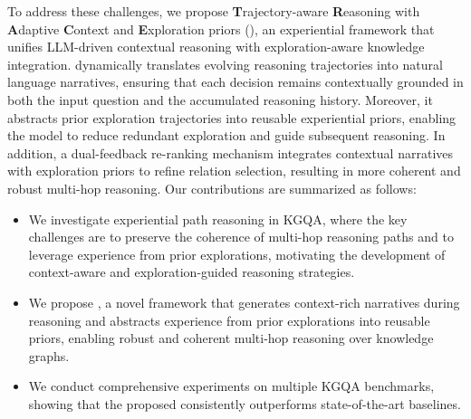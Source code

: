 To address these challenges, we propose \textbf{T}rajectory-aware \textbf{R}easoning with \textbf{A}daptive \textbf{C}ontext and \textbf{E}xploration priors (\method{}), an experiential framework that unifies LLM-driven contextual reasoning with exploration-aware knowledge integration. \method{} dynamically translates evolving reasoning trajectories into natural language narratives, ensuring that each decision remains contextually grounded in both the input question and the accumulated reasoning history. Moreover, it abstracts prior exploration trajectories into reusable experiential priors, enabling the model to reduce redundant exploration and guide subsequent reasoning. In addition, a dual-feedback re-ranking mechanism integrates contextual narratives with exploration priors to refine relation selection, resulting in more coherent and robust multi-hop reasoning. Our contributions are summarized as follows:



\begin{itemize}[itemsep=2pt,topsep=0pt,parsep=0pt,leftmargin=*]
 \item We investigate experiential path reasoning in KGQA, where the key challenges are to preserve the coherence of multi-hop reasoning paths and to leverage experience from prior explorations, motivating the development of context-aware and exploration-guided reasoning strategies.

 \item We propose \method{}, a novel framework that generates context-rich narratives during reasoning and abstracts experience from prior explorations into reusable priors, enabling robust and coherent multi-hop reasoning over knowledge graphs.

 \item We conduct comprehensive experiments on multiple KGQA benchmarks, showing that the proposed \method{} consistently outperforms state-of-the-art baselines.  
\end{itemize}

